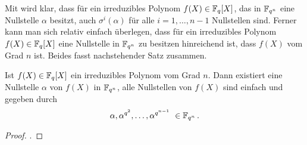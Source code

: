 Mit  wird klar, dass für ein
irreduzibles Polynom $f(X) \in \mathbb{F}_q[X]$, das in $\mathbb{F}_{q^n}$ eine Nullstelle 
$\alpha$ besitzt, auch $\sigma^i(\alpha)$ für alle $i=1,\ldots,n-1$
Nullstellen sind. 
Ferner kann man sich relativ einfach überlegen, dass
für ein irreduzibles Polynom $f(X)\in \mathbb{F}_q[X]$ eine Nullstelle 
in $\mathbb{F}_{q^n}$ zu besitzen hinreichend ist, dass $f(X)$ vom Grad $n$ ist. 
Beides fasst nachstehender Satz zusammen.

\begin{satz}
  \label{satz:nst_irred_polys}
  Ist $f(X) \in \mathbb{F}_q[X]$ ein irreduzibles Polynom vom Grad $n$. Dann 
  existiert eine Nullstelle $\alpha$ von $f(X)$ in $\mathbb{F}_{q^n}$, alle 
  Nullstellen von $f(X)$ sind einfach und gegeben durch
  \[ \alpha, \alpha^{q^2}, \ldots, \alpha^{q^{n-1}}\ \in \mathbb{F}_{q^n}\,.\]
\end{satz}
\begin{proof}
  \autocite[Theorem 2.14]{lidl1997finite}.
\end{proof}
